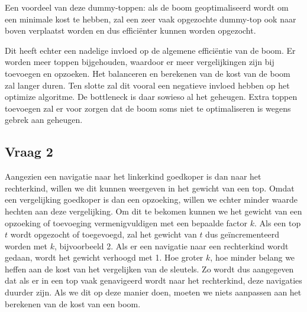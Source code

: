 \documentclass[titlepage,a4paper]{article}
\begin{document}
Een voordeel van deze dummy-toppen: als de boom geoptimaliseerd wordt om een minimale kost te hebben, zal een zeer vaak opgezochte dummy-top ook naar boven verplaatst worden en dus effici\"enter kunnen worden opgezocht.

Dit heeft echter een nadelige invloed op de algemene effici\"entie van de boom. Er worden meer toppen bijgehouden, waardoor er meer vergelijkingen zijn bij toevoegen en opzoeken. Het balanceren en berekenen van de kost van de boom zal langer duren. Ten slotte zal dit vooral een negatieve invloed hebben op het optimize algoritme. De bottleneck is daar sowieso al het geheugen. Extra toppen toevoegen zal er voor zorgen dat de boom soms niet te optimaliseren is wegens gebrek aan geheugen.

\subsection{Vraag 2}
Aangezien een navigatie naar het linkerkind goedkoper is dan naar het rechterkind, willen we dit kunnen weergeven in het gewicht van een top. Omdat een vergelijking goedkoper is dan een opzoeking, willen we echter minder waarde hechten aan deze vergelijking. Om dit te bekomen kunnen we het gewicht van een opzoeking of toevoeging vermenigvuldigen met een bepaalde factor $k$. Als een top $t$ wordt opgezocht of toegevoegd, zal het gewicht van $t$ dus ge\"incrementeerd worden met $k$, bijvoorbeeld 2. Als er een navigatie naar een rechterkind wordt gedaan, wordt het gewicht verhoogd met 1. Hoe groter $k$, hoe minder belang we heffen aan de kost van het vergelijken van de sleutels. Zo wordt dus aangegeven dat als er in een top vaak genavigeerd wordt naar het rechterkind, deze navigaties duurder zijn. Als we dit op deze manier doen, moeten we niets aanpassen aan het berekenen van de kost van een boom.
\end{document}
